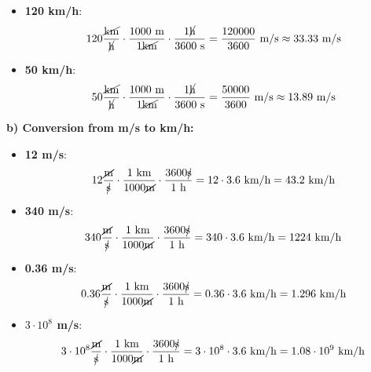 \begin{exercise}
\begin{solu}
\begin{itemize}
            \item \textbf{120 km/h}:
            \[ 120 \frac{\cancel{\text{km}}}{\cancel{\text{h}}} \cdot \frac{1000 \text{ m}}{1 \cancel{\text{km}}} \cdot \frac{1 \cancel{\text{h}}}{3600 \text{ s}} = \frac{120000}{3600} \text{ m/s} \approx 33.33 \text{ m/s} \]

            \item \textbf{50 km/h}:
            \[ 50 \frac{\cancel{\text{km}}}{\cancel{\text{h}}} \cdot \frac{1000 \text{ m}}{1 \cancel{\text{km}}} \cdot \frac{1 \cancel{\text{h}}}{3600 \text{ s}} = \frac{50000}{3600} \text{ m/s} \approx 13.89 \text{ m/s} \]
        \end{itemize}

        \textbf{b) Conversion from m/s to km/h:}
        \begin{itemize}
            \item \textbf{12 m/s}:
            \[ 12 \frac{\cancel{\text{m}}}{\cancel{\text{s}}} \cdot \frac{1 \text{ km}}{1000 \cancel{\text{m}}} \cdot \frac{3600 \cancel{\text{s}}}{1 \text{ h}} = 12 \cdot 3.6 \text{ km/h} = 43.2 \text{ km/h} \]

            \item \textbf{340 m/s}:
            \[ 340 \frac{\cancel{\text{m}}}{\cancel{\text{s}}} \cdot \frac{1 \text{ km}}{1000 \cancel{\text{m}}} \cdot \frac{3600 \cancel{\text{s}}}{1 \text{ h}} = 340 \cdot 3.6 \text{ km/h} = 1224 \text{ km/h} \]

            \item \textbf{0.36 m/s}:
            \[ 0.36 \frac{\cancel{\text{m}}}{\cancel{\text{s}}} \cdot \frac{1 \text{ km}}{1000 \cancel{\text{m}}} \cdot \frac{3600 \cancel{\text{s}}}{1 \text{ h}} = 0.36 \cdot 3.6 \text{ km/h} = 1.296 \text{ km/h} \]

            \item \textbf{$3 \cdot 10^8$ m/s}:
            \[ 3 \cdot 10^8 \frac{\cancel{\text{m}}}{\cancel{\text{s}}} \cdot \frac{1 \text{ km}}{1000 \cancel{\text{m}}} \cdot \frac{3600 \cancel{\text{s}}}{1 \text{ h}} = 3 \cdot 10^8 \cdot 3.6 \text{ km/h} = 1.08 \cdot 10^9 \text{ km/h} \]
        \end{itemize}
    \end{solu}
\end{exercise}


